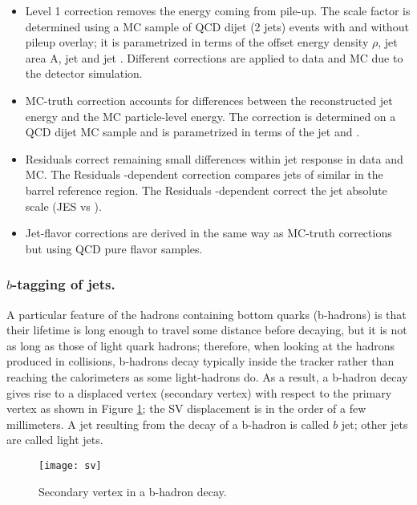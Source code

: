 \begin{itemize}
\item Level 1 correction removes the energy coming from pile-up. The scale factor is determined using a MC sample of QCD dijet (2 jets) events with and without pileup overlay; it is parametrized in terms of the offset energy density $\rho$, jet area A, jet \etac and jet \pt. Different corrections are applied to data and MC due to the detector simulation.
\item MC-truth correction accounts for differences between the reconstructed jet energy and the MC particle-level energy. The correction is determined on a QCD dijet MC sample and is parametrized in terms of the jet \pt and \etac.
\item Residuals correct remaining small differences within jet response in data and MC. The Residuals \etac-dependent correction compares jets of similar \pt in the barrel reference region. The Residuals \pt-dependent correct the jet absolute scale (JES vs \pt).
\item Jet-flavor corrections are derived in the same way as MC-truth corrections but using QCD pure flavor samples. 
\end{itemize}  

\subsubsection*{$b$-tagging of jets.}

\noindent A particular feature of the hadrons containing bottom quarks (b-hadrons) is that their lifetime is long enough to travel some distance before decaying, but it is not as long as those of light quark hadrons; therefore, when looking at the hadrons produced in \pp collisions, b-hadrons decay typically inside the tracker rather than reaching the calorimeters as some light-hadrons do. As a result, a b-hadron decay gives rise to a displaced vertex (secondary vertex) with respect to the primary vertex as shown in Figure \ref{fig:sv}; the SV displacement is in the order of a few millimeters. A jet resulting from the decay of a b-hadron is called $b$ jet; other jets are called light jets.\\ 

\begin{figure}[!h]
  \centering
  \texttt{[image: sv]}
  \caption[Secondary vertex in a b-hadron decay.]{Secondary vertex in a b-hadron decay.}\label{fig:sv}
\end{figure}

